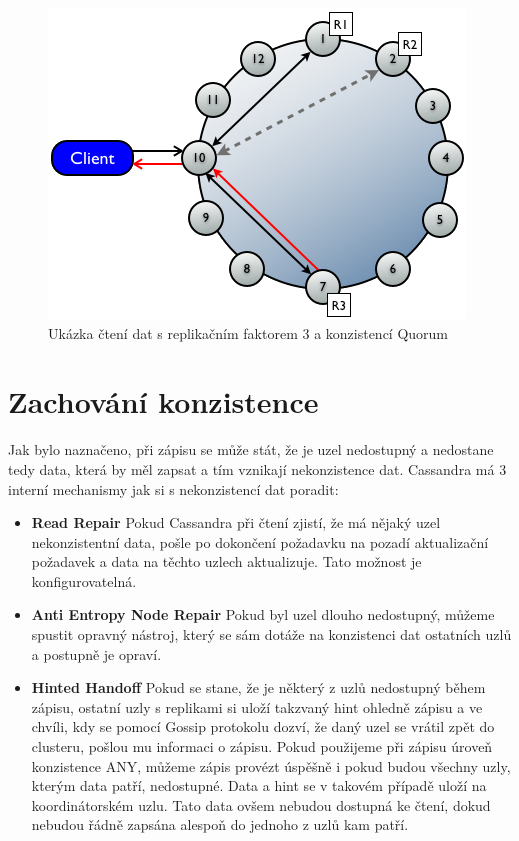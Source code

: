 \begin{figure}[h]
\centering
\includegraphics[scale=0.55]{images/read}
\caption{Ukázka čtení dat s replikačním faktorem 3 a konzistencí Quorum}
\label{fig:vnodes}
\end{figure}


\section{Zachování konzistence}%
Jak bylo naznačeno, při zápisu se může stát, že je uzel nedostupný a nedostane tedy data, která by měl zapsat a tím vznikají nekonzistence dat. Cassandra má 3 interní mechanismy jak si s nekonzistencí dat poradit: 

\begin{itemize}
\item \textbf{Read Repair} Pokud Cassandra při čtení zjistí, že má nějaký uzel nekonzistentní data, pošle po dokončení požadavku na pozadí aktualizační požadavek a data na těchto uzlech aktualizuje. Tato možnost je konfigurovatelná.
\item \textbf{Anti Entropy Node Repair} Pokud byl uzel dlouho nedostupný, můžeme spustit opravný nástroj, který se sám dotáže na konzistenci dat ostatních uzlů a postupně je opraví. 
\item \textbf{Hinted Handoff} Pokud se stane, že je některý z uzlů nedostupný během zápisu, ostatní uzly s replikami si uloží takzvaný hint ohledně zápisu a ve chvíli, kdy se pomocí Gossip protokolu dozví, že daný uzel se vrátil zpět do clusteru, pošlou mu informaci o zápisu. Pokud použijeme při zápisu úroveň konzistence ANY, můžeme zápis provézt úspěšně i pokud budou všechny uzly, kterým data patří, nedostupné. Data a hint se v takovém případě uloží na koordinátorském uzlu. Tato data ovšem nebudou dostupná ke čtení, dokud nebudou řádně zapsána alespoň do jednoho z uzlů kam patří.
\end{itemize}

